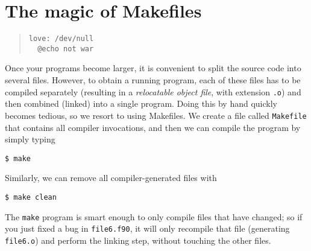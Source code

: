 \chapter{The magic of Makefiles}
\label{chap:Makefiles}

\begin{quote}
  \begin{verbatim}
love: /dev/null
  @echo not war
  \end{verbatim}
\end{quote}

Once your programs become larger, it is convenient to split the source code into several files.
However, to obtain a running program, each of these files has to be compiled separately (resulting in a \emph{relocatable object file}, with extension \texttt{.o}) and then combined (linked) into a single program.
Doing this by hand quickly becomes tedious, so we resort to using Makefiles.
We create a file called \texttt{Makefile} that contains all compiler invocations, and then we can compile the program by simply typing
\begin{verbatim}
$ make
\end{verbatim}
Similarly, we can remove all compiler-generated files with
\begin{verbatim}
$ make clean
\end{verbatim}
The \texttt{make} program is smart enough to only compile files that have changed; so if you just fixed a bug in \texttt{file6.f90}, it will only recompile that file (generating \texttt{file6.o}) and perform the linking step, without touching the other files.

